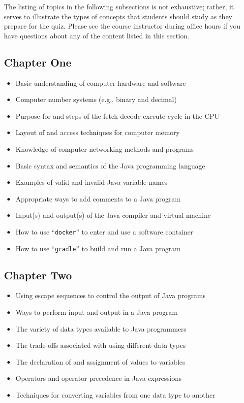 \documentclass[11pt]{article}
\newcommand{\command}[1]{``\lstinline{#1}''}
\begin{document}
The listing of topics in the following subsections is not exhaustive; rather,
it serves to illustrate the types of concepts that students should study as
they prepare for the quiz. Please see the course instructor during office hours
if you have questions about any of the content listed in this section.

\vspace*{-.1in}
\subsection*{Chapter One}

\begin{itemize}

  \itemsep 0in

  \item Basic understanding of computer hardware and software
  \item Computer number systems (e.g., binary and decimal)
  \item Purpose for and steps of the fetch-decode-execute cycle in the CPU
  \item Layout of and access techniques for computer memory
  \item Knowledge of computer networking methods and programs
  \item Basic syntax and semantics of the Java programming language
  \item Examples of valid and invalid Java variable names
  \item Appropriate ways to add comments to a Java program
  \item Input(s) and output(s) of the Java compiler and virtual machine
  \item How to use \command{docker} to enter and use a software container
  \item How to use \command{gradle} to build and run a Java program

\end{itemize}

\vspace*{-.2in}
\subsection*{Chapter Two}

\begin{itemize}

  \itemsep 0in

  \item Using escape sequences to control the output of Java programs
  \item Ways to perform input and output in a Java program
  \item The variety of data types available to Java programmers
  \item The trade-offs associated with using different data types
  \item The declaration of and assignment of values to variables
  \item Operators and operator precedence in Java expressions
  \item Techniques for converting variables from one data type to another

\end{itemize}
\end{document}
